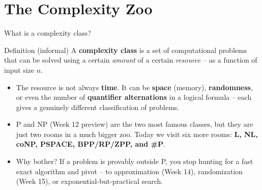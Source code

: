 \documentclass[11pt,aspectratio=169]{beamer}
\begin{document}
\section{The Complexity Zoo}

\begin{frame}{What is a complexity class?}
  \begin{block}{Definition (informal)}
    A \textbf{complexity class} is a set of computational problems that can be solved
    using a certain \emph{amount} of a certain \emph{resource} -- as a function of input
    size $n$.
  \end{block}
  \vspace{0.5em}
  \begin{itemize}
    \item The resource is not always \textbf{time}. It can be \textbf{space} (memory),
    \textbf{randomness}, or even the number of \textbf{quantifier alternations} in a
    logical formula -- each gives a genuinely different classification of problems.
    \item P and NP (Week 12 preview) are the two most famous classes, but they are just
    two rooms in a much bigger zoo. Today we visit six more rooms: \textbf{L, NL, coNP,
    PSPACE, BPP/RP/ZPP, and \#P}.
    \item Why bother? If a problem is provably outside P, you stop hunting for a fast
    exact algorithm and pivot -- to approximation (Week 14), randomization (Week 15), or
    exponential-but-practical search.
  \end{itemize}
\end{frame}
\end{document}
